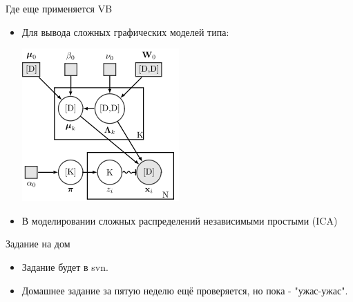 \documentclass[14pt, fleqn, xcolor={dvipsnames, table}]{beamer}
\begin{document}
\begin{frame}{Где еще применяется VB}
\begin{itemize}
\item Для вывода сложных графических моделей типа:
  \begin{center}
  \includegraphics[height=0.5\textheight]{MoreComplexSample.png}
  \end{center}
\item В моделировании сложных распределений независимыми простыми (ICA)
\end{itemize}
\end{frame}


\begin{frame}{Задание на дом}
\begin{itemize}
  \item Задание будет в svn.
  \item Домашнее задание за пятую неделю ещё проверяется, но пока - "ужас-ужас".
\end{itemize}
\end{frame}
\end{document}
